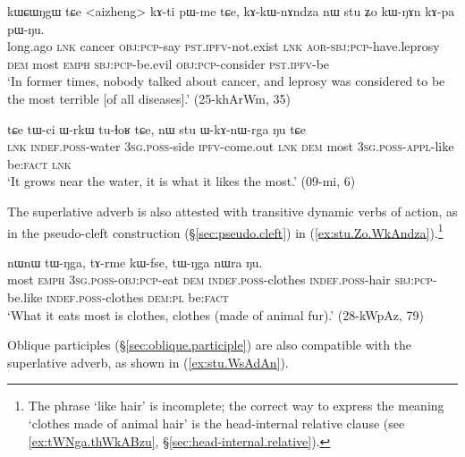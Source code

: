 \begin{exe}
\ex \label{ex:stu.kWNAn}
\gll kɯɕɯŋgɯ tɕe <aizheng> kɤ-ti pɯ-me tɕe, kɤ-kɯ-nɤndza nɯ stu ʑo kɯ-ŋɤn kɤ-pa pɯ-ŋu.  \\
long.ago \textsc{lnk} cancer \textsc{obj}:\textsc{pcp}-say \textsc{pst}.\textsc{ipfv}-not.exist \textsc{lnk} \textsc{aor}-\textsc{sbj}:\textsc{pcp}-have.leprosy \textsc{dem} most \textsc{emph} \textsc{sbj}:\textsc{pcp}-be.evil \textsc{obj}:\textsc{pcp}-consider \textsc{pst}.\textsc{ipfv}-be \\
\glt `In former times, nobody talked about cancer, and leprosy was considered to be the most terrible [of all diseases].' (25-khArWm, 35)
\end{exe}

\begin{exe}
\ex \label{ex:stu.WkAnWrga}
\gll tɕe tɯ-ci ɯ-rkɯ tu-ɬoʁ tɕe, nɯ stu ɯ-kɤ-nɯ-rga ŋu tɕe \\
\textsc{lnk} \textsc{indef}.\textsc{poss}-water \textsc{3sg}.\textsc{poss}-side \textsc{ipfv}-come.out \textsc{lnk} \textsc{dem} most \textsc{3sg}.\textsc{poss}-\textsc{appl}-like be:\textsc{fact} \textsc{lnk} \\
\glt `It grows near the water, it is what it likes the most.' (09-mi, 6)
\end{exe}

The superlative adverb is also attested with transitive dynamic verbs of action, as in the pseudo-cleft construction (§\ref{sec:pseudo.cleft}) in (\ref{ex:stu.Zo.WkAndza}).\footnote{The phrase  `like hair' is incomplete; the correct way to express the meaning `clothes made of animal hair' is the head-internal relative clause  (see \ref{ex:tWNga.thWkABzu}, §\ref{sec:head-internal.relative}).} 

\begin{exe}
\ex \label{ex:stu.Zo.WkAndza}
 nɯnɯ tɯ-ŋga, tɤ-rme kɯ-fse, tɯ-ŋga nɯra ŋu. \\
most \textsc{emph} \textsc{3sg}.\textsc{poss}-\textsc{obj}:\textsc{pcp}-eat \textsc{dem} \textsc{indef}.\textsc{poss}-clothes \textsc{indef}.\textsc{poss}-hair \textsc{sbj}:\textsc{pcp}-be.like \textsc{indef}.\textsc{poss}-clothes \textsc{dem}:\textsc{pl} be:\textsc{fact} \\
\glt `What it eats most is clothes, clothes (made of animal fur).' (28-kWpAz, 79)
\end{exe}

Oblique participles (§\ref{sec:oblique.participle}) are also compatible with the superlative adverb, as shown in (\ref{ex:stu.WsAdAn}).

